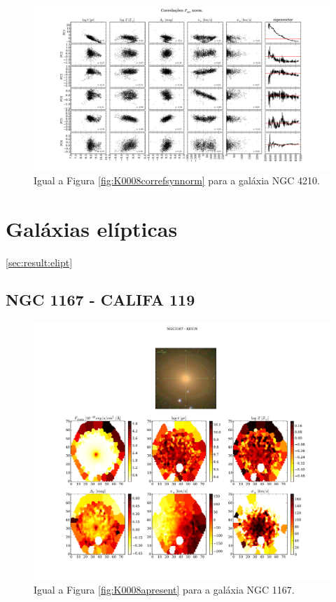 \begin{figure}
    \includegraphics[width=1.3\textwidth, angle=-90]{figuras/K0518-correl-f_syn_norm-PCvsPhys.pdf}
	\caption[Correlações PCs vs. par\^ametros f\'isicos - $F_{syn}$ norm. - NGC 4210.]
	{Igual a Figura \ref{fig:K0008correfsynnorm} para a galáxia NGC 4210.}
    \label{fig:K0518correfsynnorm}
\end{figure}

\section{Gal\'axias el\'ipticas}
\ref{sec:result:elipt}

\subsection{NGC 1167 - CALIFA 119}

\begin{figure}
    \includegraphics[width=1.\textwidth]{figuras/K0119-apresent.pdf}
    \caption[Propriedades f\'isicas da gal\'axia NGC 1167.]
    {Igual a Figura \ref{fig:K0008apresent} para a galáxia NGC 1167.}
    \label{fig:K0119apresent}
\end{figure}

